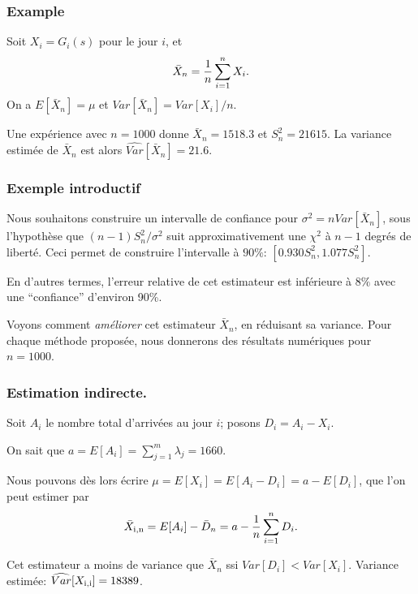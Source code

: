 \documentclass[t,usepdftitle=false]{beamer}
\begin{document}
\begin{frame}
	\frametitle{Example}
	
	Soit ${X_i} = G_i(s)$ pour le jour $i$, et 
	\[
	{\bar X_n} = {1\over n} \sum_{i=1}^n X_i.
	\]
	On a $E[\bar X_n] = \mu$ et $Var[\bar X_n] = Var[X_i]/n$.
	
	\mbox{}
	
	Une expérience avec ${n = 1000}$ donne $\bar X_n = 1518.3$ et $S_n^2
	= {21615}$.
	La variance estimée de $\bar X_n$ est alors $\widehat{Var}[\bar X_n] = 21.6$.
	
\end{frame}

\begin{frame}
	\frametitle{Exemple introductif}
	
	Nous souhaitons construire un intervalle de confiance pour $\sigma^2 = n Var[\bar X_n]$, sous
	l'hypothèse que $(n-1)S_n^2/\sigma^2$ suit approximativement une $\chi^2$ à ${n-1}$ degrés de
	liberté. Ceci permet de construire l'intervalle à $90\%$: $[0.930S_n^2, 1.077S_n^2]$.
	
	\mbox{}
	
	En d'autres termes, l'erreur relative de cet estimateur est inférieure \`a $8\%$ avec une
	``confiance'' d'environ 90\%.
	
	\mbox{}
	
	Voyons comment \emph{améliorer} cet estimateur $\bar X_n$,
	en réduisant sa variance. Pour chaque méthode proposée, 
	nous donnerons des résultats numériques pour {$n = 1000$}.
	
\end{frame}

\begin{frame}
	\frametitle{Estimation indirecte.}
	
	Soit ${A_i}$ le nombre total d'arrivées au jour $i$; posons ${D_i} = A_i - X_i$.
	
	\mbox{}
	
	On sait que ${a} = E[A_i] = \sum_{j=1}^m \lambda_j = 1660$.
	
	\mbox{}
	
	Nous pouvons dès lors écrire $\mu = E[X_i] = E[A_i - D_i] = a - E[D_i]$, que 
	l'on peut estimer par
	$$ {\bar X_{\rm{i},n}} = E[A_i] - \bar D_n = a - {1\over n} \sum_{i=1}^n D_i.$$
	
	\mbox{}
	
	Cet estimateur a moins de variance que $\bar X_n$ ssi $Var[D_i] < Var[X_i]$. 
	Variance estimée: $\widehat{Var}[X_{\rm{i},i}] = {18389}$.
	
\end{frame}
\end{document}
